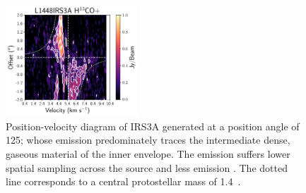 \begin{figure}[H]
\begin{center}
   \includegraphics[width=0.44\textwidth]{img/PV-Diagram_L1448IRS3B_H13COp_image_taper1500k-wide.pdf} %
\end{center}
   \caption{Position-velocity diagram of IRS3A \htcop\space  generated at a position angle of 125\deg; whose emission predominately traces the intermediate dense, gaseous material of the inner envelope. The emission suffers lower spatial sampling across the source and less emission . The dotted line corresponds to a central protostellar mass of 1.4~\solm.}\label{fig:l1448irs3a_h13cop_pv}
\end{figure}




